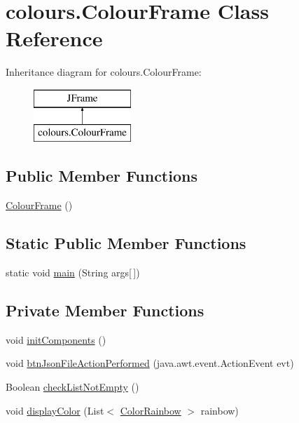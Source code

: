 \hypertarget{classcolours_1_1_colour_frame}{}\section{colours.\+Colour\+Frame Class Reference}
\label{classcolours_1_1_colour_frame}
Inheritance diagram for colours.\+Colour\+Frame\+:\begin{figure}[H]
\begin{center}
\leavevmode
\includegraphics[height=2.000000cm]{classcolours_1_1_colour_frame}
\end{center}
\end{figure}
\subsection*{Public Member Functions}
\begin{DoxyCompactItemize}
\item 
\hyperlink{classcolours_1_1_colour_frame_ab7b3858b7fb97ff26bf7534c1767270c}{Colour\+Frame} ()
\end{DoxyCompactItemize}
\subsection*{Static Public Member Functions}
\begin{DoxyCompactItemize}
\item 
static void \hyperlink{classcolours_1_1_colour_frame_a7f890970aa168fcb9791f1de589a5c2c}{main} (String args\mbox{[}$\,$\mbox{]})
\end{DoxyCompactItemize}
\subsection*{Private Member Functions}
\begin{DoxyCompactItemize}
\item 
void \hyperlink{classcolours_1_1_colour_frame_aa654076ec5e365557e85b7ba8e3dae47}{init\+Components} ()
\item 
void \hyperlink{classcolours_1_1_colour_frame_ab959355834a40b99a18e05e5121417c5}{btn\+Json\+File\+Action\+Performed} (java.\+awt.\+event.\+Action\+Event evt)
\item 
Boolean \hyperlink{classcolours_1_1_colour_frame_a693e820f5c6ea43ce0a862bd751f42c3}{check\+List\+Not\+Empty} ()
\item 
void \hyperlink{classcolours_1_1_colour_frame_a97c8597f65a97de8993a1ab05d39dd44}{display\+Color} (List$<$ \hyperlink{classcolours_1_1_color_rainbow}{Color\+Rainbow} $>$ rainbow)
\end{DoxyCompactItemize}
